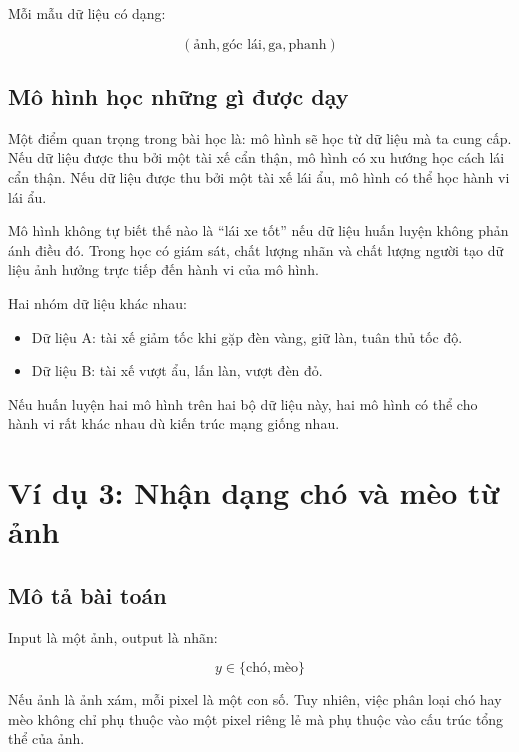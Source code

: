 \documentclass[12pt,a4paper]{report}
\begin{document}
Mỗi mẫu dữ liệu có dạng:

\[
    (\text{ảnh}, \text{góc lái}, \text{ga}, \text{phanh})
\]

\section{Mô hình học những gì được dạy}

Một điểm quan trọng trong bài học là: mô hình sẽ học từ dữ liệu mà ta cung cấp. Nếu dữ liệu được thu bởi một tài xế cẩn thận, mô hình có xu hướng học cách lái cẩn thận. Nếu dữ liệu được thu bởi một tài xế lái ẩu, mô hình có thể học hành vi lái ẩu.

\begin{canhbao}
Mô hình không tự biết thế nào là ``lái xe tốt'' nếu dữ liệu huấn luyện không phản ánh điều đó. Trong học có giám sát, chất lượng nhãn và chất lượng người tạo dữ liệu ảnh hưởng trực tiếp đến hành vi của mô hình.
\end{canhbao}

\begin{vidu}
Hai nhóm dữ liệu khác nhau:

\begin{itemize}
    \item Dữ liệu A: tài xế giảm tốc khi gặp đèn vàng, giữ làn, tuân thủ tốc độ.
    \item Dữ liệu B: tài xế vượt ẩu, lấn làn, vượt đèn đỏ.
\end{itemize}

Nếu huấn luyện hai mô hình trên hai bộ dữ liệu này, hai mô hình có thể cho hành vi rất khác nhau dù kiến trúc mạng giống nhau.
\end{vidu}

\chapter{Ví dụ 3: Nhận dạng chó và mèo từ ảnh}

\section{Mô tả bài toán}

Input là một ảnh, output là nhãn:

\[
    y \in \{\text{chó}, \text{mèo}\}
\]

Nếu ảnh là ảnh xám, mỗi pixel là một con số. Tuy nhiên, việc phân loại chó hay mèo không chỉ phụ thuộc vào một pixel riêng lẻ mà phụ thuộc vào cấu trúc tổng thể của ảnh.
\end{document}
